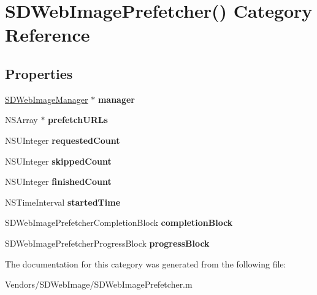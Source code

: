 \hypertarget{category_s_d_web_image_prefetcher_07_08}{}\section{S\+D\+Web\+Image\+Prefetcher() Category Reference}
\label{category_s_d_web_image_prefetcher_07_08}
\subsection*{Properties}
\begin{DoxyCompactItemize}
\item 
\hypertarget{category_s_d_web_image_prefetcher_07_08_a9e35f9996e6dae2a5d09aadf1fd673c3}{}\hyperlink{interface_s_d_web_image_manager}{S\+D\+Web\+Image\+Manager} $\ast$ {\bfseries manager}\label{category_s_d_web_image_prefetcher_07_08_a9e35f9996e6dae2a5d09aadf1fd673c3}

\item 
\hypertarget{category_s_d_web_image_prefetcher_07_08_a19684fa5375c798b3c960f590162ba14}{}N\+S\+Array $\ast$ {\bfseries prefetch\+U\+R\+Ls}\label{category_s_d_web_image_prefetcher_07_08_a19684fa5375c798b3c960f590162ba14}

\item 
\hypertarget{category_s_d_web_image_prefetcher_07_08_a04e5e34aee014e791495a443b6980e83}{}N\+S\+U\+Integer {\bfseries requested\+Count}\label{category_s_d_web_image_prefetcher_07_08_a04e5e34aee014e791495a443b6980e83}

\item 
\hypertarget{category_s_d_web_image_prefetcher_07_08_aaa9539ca9ac09907b74fcbc05b82facf}{}N\+S\+U\+Integer {\bfseries skipped\+Count}\label{category_s_d_web_image_prefetcher_07_08_aaa9539ca9ac09907b74fcbc05b82facf}

\item 
\hypertarget{category_s_d_web_image_prefetcher_07_08_a52053a7d1470e158f9e2b7baaf7d244b}{}N\+S\+U\+Integer {\bfseries finished\+Count}\label{category_s_d_web_image_prefetcher_07_08_a52053a7d1470e158f9e2b7baaf7d244b}

\item 
\hypertarget{category_s_d_web_image_prefetcher_07_08_a3fd1f7b1ba9d906fe568a5ca796b5331}{}N\+S\+Time\+Interval {\bfseries started\+Time}\label{category_s_d_web_image_prefetcher_07_08_a3fd1f7b1ba9d906fe568a5ca796b5331}

\item 
\hypertarget{category_s_d_web_image_prefetcher_07_08_a31dc5453af46cad5dc93e3f2de03d94f}{}S\+D\+Web\+Image\+Prefetcher\+Completion\+Block {\bfseries completion\+Block}\label{category_s_d_web_image_prefetcher_07_08_a31dc5453af46cad5dc93e3f2de03d94f}

\item 
\hypertarget{category_s_d_web_image_prefetcher_07_08_a0606e1389270ff7fae6370c1942dff22}{}S\+D\+Web\+Image\+Prefetcher\+Progress\+Block {\bfseries progress\+Block}\label{category_s_d_web_image_prefetcher_07_08_a0606e1389270ff7fae6370c1942dff22}

\end{DoxyCompactItemize}


The documentation for this category was generated from the following file\+:\begin{DoxyCompactItemize}
\item 
Vendors/\+S\+D\+Web\+Image/S\+D\+Web\+Image\+Prefetcher.\+m\end{DoxyCompactItemize}
